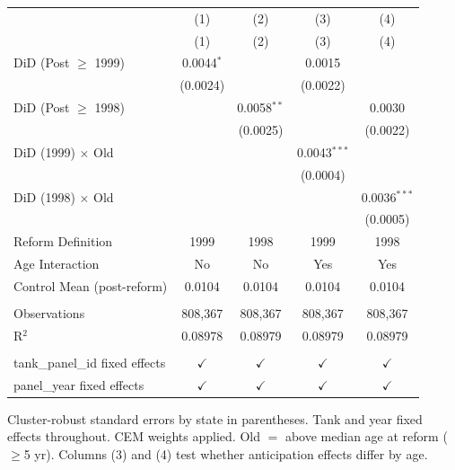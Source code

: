 
\begingroup
\centering
\begin{tabular}{lcccc}
   \toprule
                                   & (1)           & (2)           & (3)            & (4) \\   
                                   & (1)           & (2)           & (3)            & (4)\\  
   \midrule 
   DiD (Post $\geq$ 1999)          & 0.0044$^{*}$  &               & 0.0015         &   \\   
                                   & (0.0024)      &               & (0.0022)       &   \\   
   DiD (Post $\geq$ 1998)          &               & 0.0058$^{**}$ &                & 0.0030\\   
                                   &               & (0.0025)      &                & (0.0022)\\   
   DiD (1999) $\times$ Old         &               &               & 0.0043$^{***}$ &   \\   
                                   &               &               & (0.0004)       &   \\   
   DiD (1998) $\times$ Old         &               &               &                & 0.0036$^{***}$\\   
                                   &               &               &                & (0.0005)\\   
   Reform Definition               & 1999          & 1998          & 1999           & 1998\\  
   Age Interaction                 & No            & No            & Yes            & Yes\\  
   Control Mean (post-reform)      & 0.0104        & 0.0104        & 0.0104         & 0.0104\\  
    \\
   Observations                    & 808,367       & 808,367       & 808,367        & 808,367\\  
   R$^2$                           & 0.08978       & 0.08979       & 0.08979        & 0.08979\\  
    \\
   tank\_panel\_id fixed effects   & $\checkmark$  & $\checkmark$  & $\checkmark$   & $\checkmark$\\   
   panel\_year fixed effects       & $\checkmark$  & $\checkmark$  & $\checkmark$   & $\checkmark$\\   
   \bottomrule
\end{tabular}
 
\par \raggedright 
Cluster-robust standard errors by state in parentheses. Tank and year fixed effects throughout. CEM weights applied. Old $=$ above median age at reform ($\geq$5 yr). Columns (3) and (4) test whether anticipation effects differ by age.
\par\endgroup


